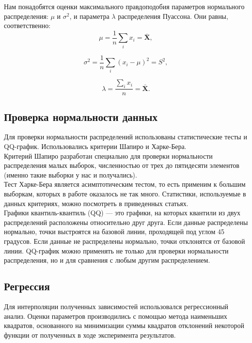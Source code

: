 Нам понадобятся оценки максимального правдоподобия параметров нормального распределения: $\mu$ и $\sigma^2$, и параметра $\lambda$ распределения Пуассона. Они равны, соответственно:
\begin{equation}
\mu = \frac{1}{n}\sum_i x_i = \mathbf{\bar{X}},
\end{equation}

\begin{equation}
\sigma^2 =  \frac{1}{n}\sum_i (x_i-\mu)^2 = S^2,
\end{equation}

\begin{equation}
\lambda = \frac{\sum_i x_i}{n} = \mathbf{\bar{X}}.
\end{equation}

\subsection{Проверка нормальности данных}
Для проверки нормальности распределений использованы статистические тесты и QQ-график. Использовались критерии Шапиро и Харке-Бера.\\

Критерий Шапиро разработан специально для проверки нормальности распределения малых выборок, численностью от трех до пятидесяти элементов \cite{shapiro} (именно такие выборки у нас и получались).\\

Тест Харке-Бера \cite{jarqueber} является асимптотическим тестом, то есть применим к большим выборкам, которых в работе оказалось не так много. Статистики, используемые в данных критериях, можно посмотреть в приведенных статьях.\\

Графики квантиль-квантиль (QQ) — это графики, на которых квантили из двух распределений расположены относительно друг друга. Если данные распределены нормально, точки выстроятся на базовой линии, проходящей под углом 45 градусов. Если данные не распределены нормально, точки отклонятся от базовой линии. QQ-график можно применять не только для проверки нормальности распределения, но и для сравнения с любым другим распределением.

\subsection{Регрессия}
Для интерполяции полученных зависимостей использовался регрессионный анализ. Оценки параметров производились с помощью метода наименьших квадратов, основанного на минимизации суммы квадратов отклонений некоторой функции от полученных в ходе эксперимента результатов.


